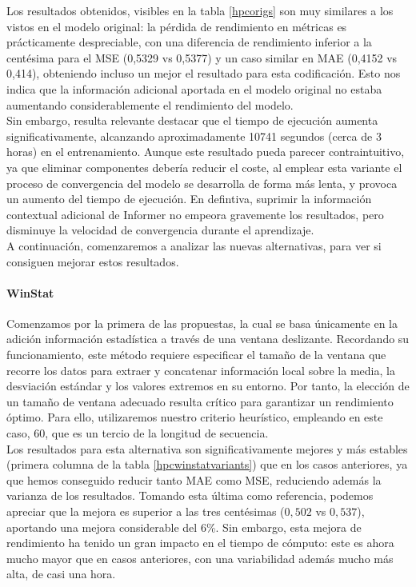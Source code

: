 Los resultados obtenidos, visibles en la tabla \ref{hpcorigs} son muy similares a los vistos en el modelo original: la pérdida de rendimiento en métricas es prácticamente despreciable, con una diferencia de rendimiento inferior a la centésima para el MSE (0,5329 vs 0,5377) y un caso similar en MAE (0,4152 vs 0,414), obteniendo incluso un mejor el resultado para esta codificación. Esto nos indica que la información adicional aportada en el modelo original no estaba aumentando considerablemente el rendimiento del modelo.\\

Sin embargo, resulta relevante destacar que el tiempo de ejecución aumenta significativamente, alcanzando aproximadamente 10741 segundos (cerca de 3 horas) en el entrenamiento. Aunque este resultado pueda parecer contraintuitivo, ya que eliminar componentes debería reducir el coste, al emplear esta variante el proceso de convergencia del modelo se desarrolla de forma más lenta, y provoca un aumento del tiempo de ejecución. En defintiva, suprimir la información contextual adicional de Informer no empeora gravemente los resultados, pero disminuye la velocidad de convergencia durante el aprendizaje.\\

A continuación, comenzaremos a analizar las nuevas alternativas, para ver si consiguen mejorar estos resultados.

\paragraph{WinStat}

Comenzamos por la primera de las propuestas, la cual se basa únicamente en la adición información estadística a través de una ventana deslizante. Recordando su funcionamiento, este método requiere especificar el tamaño de la ventana que recorre los datos para extraer y concatenar información local sobre la media, la desviación estándar y los valores extremos en su entorno. Por tanto, la elección de un tamaño de ventana adecuado resulta crítico para garantizar un rendimiento óptimo. Para ello, utilizaremos nuestro criterio heurístico, empleando en este caso, 60, que es un tercio de la longitud de secuencia.\\

Los resultados para esta alternativa son significativamente mejores y más estables (primera columna de la tabla \ref{hpcwinstatvariants}) que en los casos anteriores, ya que hemos conseguido reducir tanto MAE como MSE, reduciendo además la varianza de los resultados. Tomando esta última como referencia, podemos apreciar que la mejora es superior a las tres centésimas ($0,502$ vs $0,537$), aportando una mejora considerable del 6\%. Sin embargo, esta mejora de rendimiento ha tenido un gran impacto en el tiempo de cómputo: este es ahora mucho mayor que en casos anteriores, con una variabilidad además mucho más alta, de casi una hora.\\

